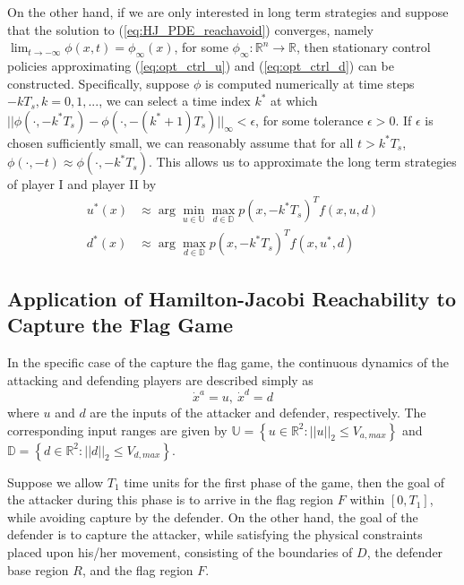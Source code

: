 On the other hand, if we are only interested in long term strategies and suppose that the solution to (\ref{eq:HJ_PDE_reachavoid}) converges, namely $\lim_{t \rightarrow -\infty} \phi(x,t) = \phi_\infty(x)$, for some $\phi_\infty: \mathbb{R}^n \rightarrow \mathbb{R}$, then stationary control policies approximating (\ref{eq:opt_ctrl_u}) and (\ref{eq:opt_ctrl_d}) can be constructed.  Specifically, suppose $\phi$ is computed numerically at time steps $-kT_s, k = 0,1,...$, we can select a time index $k^*$ at which $||\phi(\cdot, -k^*T_s) - \phi(\cdot, -(k^*+1)T_s)||_\infty < \epsilon$, for some tolerance $\epsilon > 0$.  If $\epsilon$ is chosen sufficiently small, we can reasonably assume that for all $t > k^*T_s$, $\phi(\cdot, -t) \approx \phi(\cdot, -k^*T_s)$.  This allows us to approximate the long term strategies of player I and player II by
\begin{align}
	\label{eq:opt_ctrl_inf_u}
  u^*(x) &\approx \arg \min_{u \in \mathbb{U}} \max_{d \in \mathbb{D}} p(x,-k^*T_s)^T f(x,u,d) \\
  \label{eq:opt_ctrl_inf_d}
  d^*(x) &\approx \arg \max_{d \in \mathbb{D}} p(x,-k^*T_s)^T f(x,u^*,d) 
\end{align}

\subsection{Application of Hamilton-Jacobi Reachability to Capture the Flag Game}
\label{subsec:hj_application}

In the specific case of the capture the flag game, the continuous dynamics of the
attacking and defending players are described simply as
\begin{equation}
\label{eq:ctf_dynamics}
\dot{x}^a = u, \ \dot{x}^d = d
\end{equation}
where $u$ and $d$ are the inputs of the attacker and defender, respectively.  The
corresponding input ranges are given by 
$\mathbb{U} = \left\{u \in \mathbb{R}^2: || u ||_2 \leq V_{a,max}\right\}$ and
$\mathbb{D} = \left\{d \in \mathbb{R}^2: || d ||_2 \leq V_{d,max}\right\}$.

Suppose we allow $T_1$ time units for the first phase of the game,
then the goal of the attacker during this phase is to arrive in 
the flag region $F$ within $[0,T_1]$, while avoiding capture by the defender.  
On the other hand, the goal of the defender is to capture the attacker, 
while satisfying the physical constraints placed upon his/her movement, 
consisting of the boundaries of $D$, the defender base region $R$,
and the flag region $F$.

